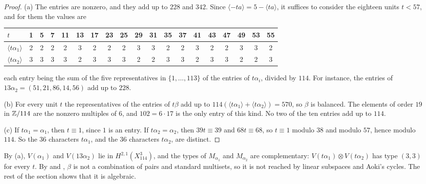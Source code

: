 \begin{proof}
(a) The entries are nonzero, and they add up to $228$ and $342$. Since
$\langle-ta\rangle=5-\langle ta\rangle$, it suffices to consider the
eighteen units $t<57$, and for them the values are
\begin{center}
\small
\setlength{\tabcolsep}{3.2pt}
\begin{tabular}{l*{18}{c}}
\toprule
$t$ & 1 & 5 & 7 & 11 & 13 & 17 & 23 & 25 & 29 & 31 & 35 & 37 & 41 & 43 & 47 & 49 & 53 & 55\\
\midrule
$\langle t\alpha_{1}\rangle$ & 2&2&2&2&3&2&2&2&3&3&2&2&3&2&2&3&3&2\\
$\langle t\alpha_{2}\rangle$ & 3&3&3&3&2&3&3&3&2&2&3&3&2&3&3&2&2&3\\
\bottomrule
\end{tabular}
\end{center}
each entry being the sum of the five representatives in $\{1,\dots,113\}$
of the entries of $t\alpha_{i}$, divided by $114$. For instance, the entries
of $13\alpha_{2}=(51,21,86,14,56)$ add up to $228$.

(b) For every unit $t$ the representatives of the entries of $t\beta$ add up
to $114(\langle t\alpha_{1}\rangle+\langle t\alpha_{2}\rangle)=570$, so
$\beta$ is balanced. The elements of order $19$ in $\mathbb{Z}/114$ are the nonzero
multiples of $6$, and $102=6\cdot17$ is the only entry of this kind. No two
of the ten entries add up to $114$.

(c) If $t\alpha_{1}=\alpha_{1}$, then $t\equiv1$, since $1$ is an entry. If
$t\alpha_{2}=\alpha_{2}$, then $39t\equiv39$ and $68t\equiv68$, so $t\equiv1$
modulo $38$ and modulo $57$, hence modulo $114$. So the $36$ characters
$t\alpha_{1}$, and the $36$ characters $t\alpha_{2}$, are distinct.
\end{proof}

By (a), $V(\alpha_{1})$ and $V(13\alpha_{2})$ lie in $H^{2,1}(X^{3}_{114})$,
and the types of $M_{\alpha_{1}}$ and $M_{\alpha_{2}}$ are complementary:
$V(t\alpha_{1})\otimes V(t\alpha_{2})$ has type $(3,3)$ for every $t$. By
 and , $\beta$ is not a combination of pairs and standard
multisets, so it is not reached by linear subspaces and Aoki's cycles. The
rest of the section shows that it is algebraic.

